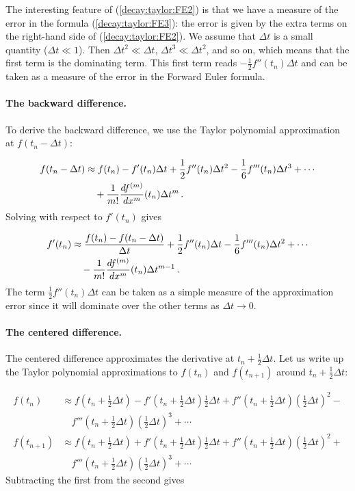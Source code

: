 \documentclass[%
oneside,                 %
final,                   %
10pt]{article}
\begin{document}
The interesting feature of (\ref{decay:taylor:FE2}) is that we have
a measure of the error in the formula (\ref{decay:taylor:FE3}): the
error is given by the extra terms on the right-hand side of
(\ref{decay:taylor:FE2}). We assume that $\Delta t$ is a small quantity
($\Delta t\ll 1$).
Then $\Delta t^2\ll\Delta t$, $\Delta t^3\ll \Delta t^2$, and so on,
which means that the first term is the dominating term. This first
term reads $-\frac{1}{2}f''(t_n)\Delta t$ and can be taken as a
measure of the error in the Forward Euler formula.

\paragraph{The backward difference.}
To derive the backward difference, we use the Taylor polynomial
approximation at $f(t_n-\Delta t)$:

\begin{align}
f(t_n-\Delta t) &\approx f(t_n) - f'(t_n)\Delta t + \frac{1}{2}f''(t_n)
\Delta t^2 -
\frac{1}{6}f'''(t_n)\Delta t^3+ \cdots\nonumber\\ 
&\quad + \frac{1}{m!}\frac{df^{(m)}}{dx^m}(t_n)\Delta t^m\thinspace .
\label{decay:taylor:BE1}
\end{align}
Solving with respect to $f'(t_n)$ gives

\begin{align}
f'(t_n) &\approx \frac{f(t_n) - f(t_n-\Delta t)}{\Delta t}
+ \frac{1}{2}f''(t_n)\Delta t -
\frac{1}{6}f'''(t_n)\Delta t^2+ \cdots\nonumber\\ 
&\quad - \frac{1}{m!}\frac{df^{(m)}}{dx^m}(t_n)\Delta t^{m-1}\thinspace .
\label{decay:taylor:BE2}
\end{align}
The term $\frac{1}{2}f''(t_n)\Delta t$ can be taken as a simple measure of
the approximation error since it will dominate over the other terms
as $\Delta t\rightarrow 0$.

\paragraph{The centered difference.}
The centered difference approximates the derivative at
$t_n+\frac{1}{2}\Delta t$. Let us write up the Taylor polynomial
approximations to $f(t_n)$ and $f(t_{n+1})$ around $t_n+\frac{1}{2}\Delta t$:

\begin{align}
f(t_n) &\approx f(t_n+\frac{1}{2}\Delta t) -
f'(t_n+\frac{1}{2}\Delta t)\frac{1}{2}\Delta t +
f''(t_n+\frac{1}{2}\Delta t)(\frac{1}{2}\Delta t)^2 -\nonumber\\ 
& \quad f'''(t_n+\frac{1}{2}\Delta t)(\frac{1}{2}\Delta t)^3 + \cdots\\ 
f(t_{n+1}) & \approx f(t_n+\frac{1}{2}\Delta t) +
f'(t_n+\frac{1}{2}\Delta t)\frac{1}{2}\Delta t +
f''(t_n+\frac{1}{2}\Delta t)(\frac{1}{2}\Delta t)^2 +\nonumber\\ 
&\quad f'''(t_n+\frac{1}{2}\Delta t)(\frac{1}{2}\Delta t)^3 + \cdots
\end{align}
Subtracting the first from the second gives
\end{document}
